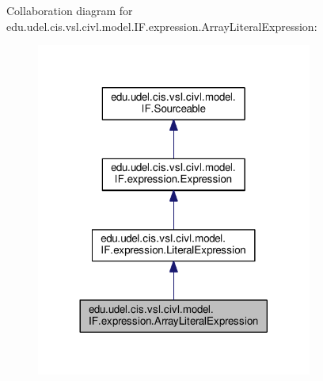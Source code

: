 Collaboration diagram for edu.\+udel.\+cis.\+vsl.\+civl.\+model.\+I\+F.\+expression.\+Array\+Literal\+Expression\+:
\nopagebreak
\begin{figure}[H]
\begin{center}
\leavevmode
\includegraphics[width=257pt]{interfaceedu_1_1udel_1_1cis_1_1vsl_1_1civl_1_1model_1_1IF_1_1expression_1_1ArrayLiteralExpression__coll__graph}
\end{center}
\end{figure}
